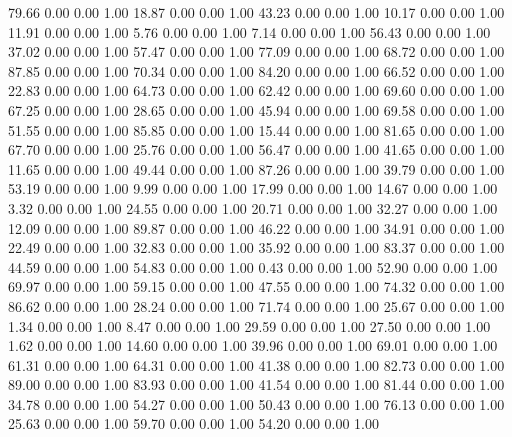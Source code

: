    79.66   0.00   0.00   1.00
   18.87   0.00   0.00   1.00
   43.23   0.00   0.00   1.00
   10.17   0.00   0.00   1.00
   11.91   0.00   0.00   1.00
    5.76   0.00   0.00   1.00
    7.14   0.00   0.00   1.00
   56.43   0.00   0.00   1.00
   37.02   0.00   0.00   1.00
   57.47   0.00   0.00   1.00
   77.09   0.00   0.00   1.00
   68.72   0.00   0.00   1.00
   87.85   0.00   0.00   1.00
   70.34   0.00   0.00   1.00
   84.20   0.00   0.00   1.00
   66.52   0.00   0.00   1.00
   22.83   0.00   0.00   1.00
   64.73   0.00   0.00   1.00
   62.42   0.00   0.00   1.00
   69.60   0.00   0.00   1.00
   67.25   0.00   0.00   1.00
   28.65   0.00   0.00   1.00
   45.94   0.00   0.00   1.00
   69.58   0.00   0.00   1.00
   51.55   0.00   0.00   1.00
   85.85   0.00   0.00   1.00
   15.44   0.00   0.00   1.00
   81.65   0.00   0.00   1.00
   67.70   0.00   0.00   1.00
   25.76   0.00   0.00   1.00
   56.47   0.00   0.00   1.00
   41.65   0.00   0.00   1.00
   11.65   0.00   0.00   1.00
   49.44   0.00   0.00   1.00
   87.26   0.00   0.00   1.00
   39.79   0.00   0.00   1.00
   53.19   0.00   0.00   1.00
    9.99   0.00   0.00   1.00
   17.99   0.00   0.00   1.00
   14.67   0.00   0.00   1.00
    3.32   0.00   0.00   1.00
   24.55   0.00   0.00   1.00
   20.71   0.00   0.00   1.00
   32.27   0.00   0.00   1.00
   12.09   0.00   0.00   1.00
   89.87   0.00   0.00   1.00
   46.22   0.00   0.00   1.00
   34.91   0.00   0.00   1.00
   22.49   0.00   0.00   1.00
   32.83   0.00   0.00   1.00
   35.92   0.00   0.00   1.00
   83.37   0.00   0.00   1.00
   44.59   0.00   0.00   1.00
   54.83   0.00   0.00   1.00
    0.43   0.00   0.00   1.00
   52.90   0.00   0.00   1.00
   69.97   0.00   0.00   1.00
   59.15   0.00   0.00   1.00
   47.55   0.00   0.00   1.00
   74.32   0.00   0.00   1.00
   86.62   0.00   0.00   1.00
   28.24   0.00   0.00   1.00
   71.74   0.00   0.00   1.00
   25.67   0.00   0.00   1.00
    1.34   0.00   0.00   1.00
    8.47   0.00   0.00   1.00
   29.59   0.00   0.00   1.00
   27.50   0.00   0.00   1.00
    1.62   0.00   0.00   1.00
   14.60   0.00   0.00   1.00
   39.96   0.00   0.00   1.00
   69.01   0.00   0.00   1.00
   61.31   0.00   0.00   1.00
   64.31   0.00   0.00   1.00
   41.38   0.00   0.00   1.00
   82.73   0.00   0.00   1.00
   89.00   0.00   0.00   1.00
   83.93   0.00   0.00   1.00
   41.54   0.00   0.00   1.00
   81.44   0.00   0.00   1.00
   34.78   0.00   0.00   1.00
   54.27   0.00   0.00   1.00
   50.43   0.00   0.00   1.00
   76.13   0.00   0.00   1.00
   25.63   0.00   0.00   1.00
   59.70   0.00   0.00   1.00
   54.20   0.00   0.00   1.00

